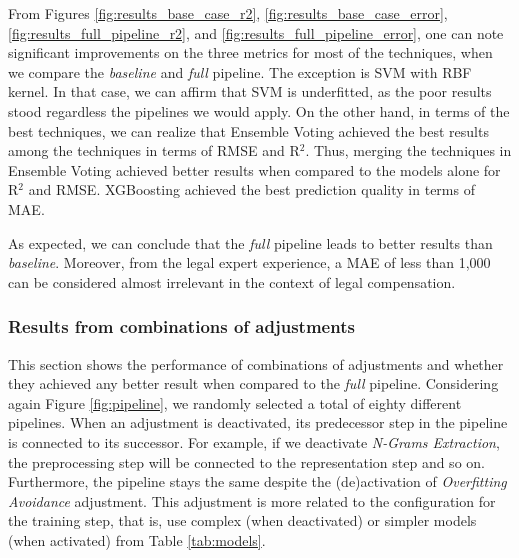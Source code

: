 From Figures \ref{fig:results_base_case_r2}, \ref{fig:results_base_case_error}, \ref{fig:results_full_pipeline_r2}, and \ref{fig:results_full_pipeline_error}, one can note significant improvements on the three metrics for most of the techniques, when we compare the \textit{baseline} and \textit{full} pipeline. The exception is \gls{SVM} with \gls{RBF} kernel. In that case, we can affirm that \gls{SVM} is underfitted, as the poor results stood regardless the pipelines we would apply. On the other hand, in terms of the best techniques, we can realize that Ensemble Voting achieved the best results among the techniques in terms of \gls{RMSE} and R$^2$. Thus, merging the techniques in Ensemble Voting achieved better results when compared to the models alone for R$^2$ and \gls{RMSE}. XGBoosting achieved the best prediction quality in terms of \gls{MAE}. 


As expected, we can conclude that the \textit{full} pipeline leads to better results than \textit{baseline}. Moreover, from the legal expert experience, a \gls{MAE} of less than 1,000 can be considered almost irrelevant in the context of legal compensation. 


\subsubsection{Results from combinations of adjustments}

This section shows the performance of combinations of adjustments and whether they achieved any better result when compared to the \textit{full} pipeline. Considering again Figure \ref{fig:pipeline}, we randomly selected a total of eighty different pipelines. 
%
When an adjustment is deactivated, its predecessor step in the pipeline is connected to its successor. For example, if we deactivate \textit{N-Grams Extraction}, the preprocessing step will be connected to the representation step and so on. 
%
Furthermore, the pipeline stays the same despite the (de)activation of \textit{Overfitting Avoidance} adjustment. This adjustment is more related to the configuration for the training step, that is, use complex (when deactivated) or simpler models (when activated) from Table \ref{tab:models}.

